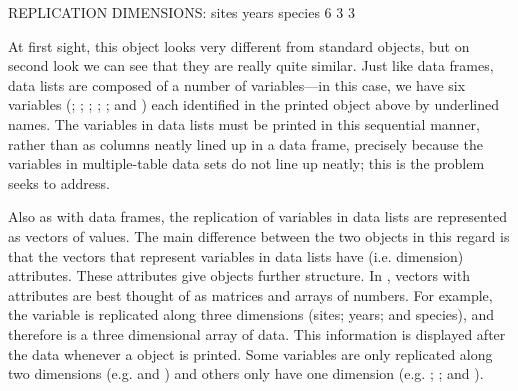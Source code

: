 \documentclass[a4paper]{report}
\begin{document}
\begin{article}
\begin{Schunk}
\begin{Soutput}
REPLICATION DIMENSIONS: 
  sites   years species 
      6       3       3 
\end{Soutput}
\end{Schunk}

At first sight, this  object looks very different from standard  objects, but on second look we can see that they are really quite similar.  Just like data frames, data lists are composed of a number of variables---in this case, we have six variables (; ; ; ; ; and ) each identified in the printed object above by underlined names.  The variables in data lists must be printed in this sequential manner, rather than as columns neatly lined up in a data frame, precisely because the variables in multiple-table data sets do not line up neatly; this is the problem  seeks to address.

Also as with data frames, the replication of variables in data lists are represented as vectors of values.  The main difference between the two objects in this regard is that the vectors that represent variables in data lists have  (i.e. dimension) attributes.  These  attributes give  objects further structure.  In \R, vectors with  attributes are best thought of as matrices and arrays of numbers.  For example, the  variable is replicated along three dimensions (sites; years; and species), and therefore is a three dimensional array of data.  This information is displayed after the data whenever a  object is printed.  Some variables are only replicated along two dimensions (e.g.  and ) and others only have one dimension (e.g. ; ; and ).  



\end{article}
\end{document}
